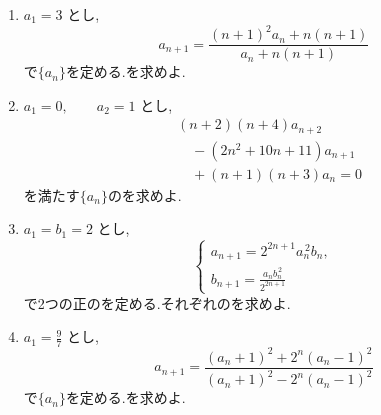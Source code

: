 \begin{enumerate}[label=\textbf{問\arabic*.},leftmargin=3.8em,format=\bookitemlink{practice-advanced}{problem}{hint}]
    \[
      a_{n+2}a_n=2^{2n+1}a_{n+1}^{\,2}
    \]
    を満たす正の$\{a_n\}$のを求めよ.
  \item $a_1=3$ とし,
    \[
      a_{n+1}
      =\frac{(n+1)^2a_n+n(n+1)}
      {a_n+n(n+1)}
    \]
    で$\{a_n\}$を定める.を求めよ.
  \item $a_1=0,\qquad a_2=1$ とし,
    \begin{align*}
      &(n+2)(n+4)a_{n+2}\\
      &\quad-(2n^2+10n+11)a_{n+1}\\
      &\quad+(n+1)(n+3)a_n=0
    \end{align*}
    を満たす$\{a_n\}$のを求めよ.
  \item $a_1=b_1=2$ とし,
    \[
      \begin{cases}
        a_{n+1}=2^{2n+1}a_n^{\,2}b_n,\\
        b_{n+1}=\frac{a_nb_n^{\,2}}{2^{2n+1}}
      \end{cases}
    \]
    で2つの正のを定める.それぞれのを求めよ.
  \item $a_1=\frac97$ とし,
    \[
      a_{n+1}
      =\frac{(a_n+1)^2+2^n(a_n-1)^2}
      {(a_n+1)^2-2^n(a_n-1)^2}
    \]
    で$\{a_n\}$を定める.を求めよ.
\end{enumerate}

